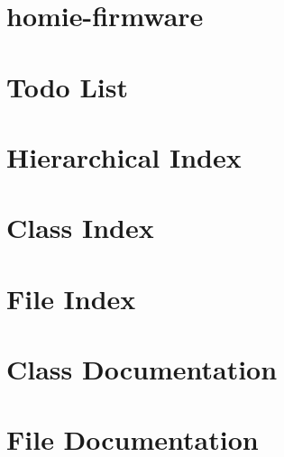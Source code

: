 \let\mypdfximage\pdfximage\def\pdfximage{\immediate\mypdfximage}\documentclass[twoside]{book}
\newcommand{\+}{\discretionary{\mbox{\scriptsize$\hookleftarrow$}}{}{}}
\newcommand{\clearemptydoublepage}{%
  \newpage{\pagestyle{empty}\cleardoublepage}%
}
\begin{document}
\chapter{homie-\/firmware}
\label{md_readme}

\chapter{Todo List}
\label{todo}

\chapter{Hierarchical Index}

\chapter{Class Index}

\chapter{File Index}

\chapter{Class Documentation}


































\chapter{File Documentation}


\backmatter
\newpage
{}
\clearemptydoublepage
{}
\printindex
\end{document}
